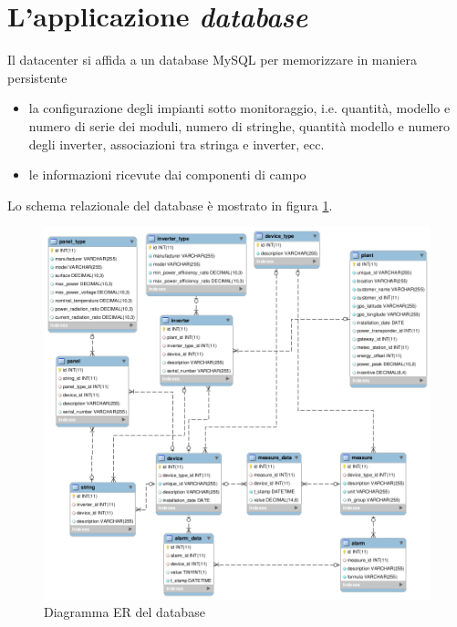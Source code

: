 \section{L'applicazione \emph{database}}
%
Il datacenter si affida a un database MySQL\cite{mysql} per memorizzare in maniera persistente
%
\begin{itemize}
\item la configurazione degli impianti sotto monitoraggio, 
      i.e. quantit\`a, modello e numero di serie dei moduli, numero di stringhe, 
      quantit\`a modello e numero degli inverter, associazioni tra stringa e inverter, ecc.
%
\item le informazioni ricevute dai componenti di campo
\end{itemize}
%
Lo schema relazionale del database \`e mostrato in figura \ref{ermodel}.
%
\begin{figure}[!h]
\centering
\includegraphics[width=400pt]{img/db-er-model.png}
\caption{Diagramma ER del database}
\label{ermodel}
\end{figure}
%

